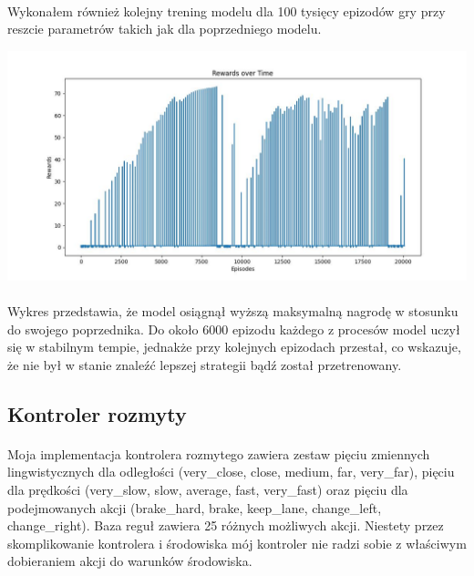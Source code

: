 \documentclass{article}
\begin{document}
\newpage

\paragraph{}
Wykonałem również kolejny trening modelu dla 100 tysięcy epizodów gry przy reszcie parametrów takich jak dla poprzedniego modelu.

\includegraphics[width=1\linewidth]{PPO.jpg}

\paragraph{}
Wykres przedstawia, że model osiągnął wyższą maksymalną nagrodę w stosunku do swojego poprzednika. Do około 6000 epizodu każdego z procesów model uczył się w stabilnym tempie, jednakże przy kolejnych epizodach przestał, co wskazuje, że nie był w stanie znaleźć lepszej strategii bądź został przetrenowany.


\subsection{Kontroler rozmyty}
\paragraph{}
Moja implementacja kontrolera rozmytego zawiera zestaw pięciu zmiennych lingwistycznych dla odległości (very\_close, close, medium, far, very\_far), pięciu dla prędkości (very\_slow, slow, average, fast, very\_fast) oraz pięciu dla podejmowanych akcji (brake\_hard, brake, keep\_lane, change\_left, change\_right). Baza reguł zawiera 25 różnych możliwych akcji. Niestety przez skomplikowanie kontrolera i środowiska mój kontroler nie radzi sobie z właściwym dobieraniem akcji do warunków środowiska.

\newpage
\end{document}
